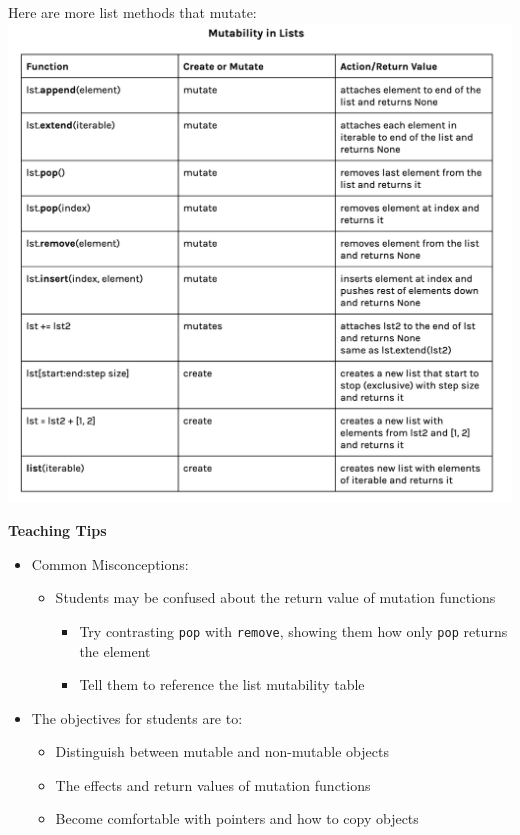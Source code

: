 Here are more list methods that mutate:
\newline
\includegraphics[width=.9\textwidth]{list-mutation.png}


\begin{guide}
	\textbf{Teaching Tips}
	\begin{itemize}
			\item Common Misconceptions:
			\begin{itemize}
				\item Students may be confused about the return value of mutation functions
				\begin{itemize}
					\item Try contrasting \lstinline{pop} with \lstinline{remove}, showing them how only \lstinline{pop} returns the element
					\item Tell them to reference the list mutability table
				\end{itemize}
			\end{itemize}
			\item The objectives for students are to:
			\begin{itemize}
				\item Distinguish between mutable and non-mutable objects
				\item The effects and return values of mutation functions
				\item Become comfortable with pointers and how to copy objects
			\end{itemize}
	\end{itemize}
\end{guide}
